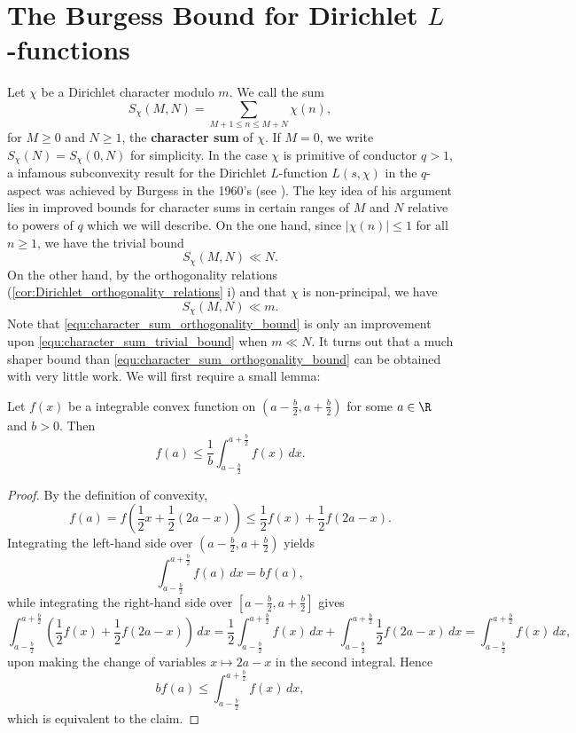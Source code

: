   \section{The Burgess Bound for Dirichlet \texorpdfstring{$L$}{L}-functions}
    Let $\chi$ be a Dirichlet character modulo $m$. We call the sum
    \[
      S_{\chi}(M,N) = \sum_{M+1 \le n \le M+N}\chi(n),
    \]
    for $M \ge 0$ and $N \ge 1$, the \textbf{character sum} of $\chi$. If $M = 0$, we write $S_{\chi}(N) = S_{\chi}(0,N)$ for simplicity. In the case $\chi$ is primitive of conductor $q > 1$, a infamous subconvexity result for the Dirichlet $L$-function $L(s,\chi)$ in the $q$-aspect was achieved by Burgess in the 1960's (see \cite{burgess1963character}). The key idea of his argument lies in improved bounds for character sums in certain ranges of $M$ and $N$ relative to powers of $q$ which we will describe. On the one hand, since $|\chi(n)| \le 1$ for all $n \ge 1$, we have the trivial bound
    \begin{equation}\label{equ:character_sum_trivial_bound}
      S_{\chi}(M,N) \ll N.
    \end{equation}
    On the other hand, by the orthogonality relations (\cref{cor:Dirichlet_orthogonality_relations} i) and that $\chi$ is non-principal, we have
    \begin{equation}\label{equ:character_sum_orthogonality_bound}
      S_{\chi}(M,N) \ll m.
    \end{equation}
    Note that \cref{equ:character_sum_orthogonality_bound} is only an improvement upon \cref{equ:character_sum_trivial_bound} when $m \ll N$. It turns out that a much shaper bound than \cref{equ:character_sum_orthogonality_bound} can be obtained with very little work. We will first require a small lemma:

    \begin{lemma}\label{lem:Polya-Vinogradov_lemma}
      Let $f(x)$ be a integrable convex function on $\left(a-\frac{b}{2},a+\frac{b}{2}\right)$ for some $a \in \R$ and $b > 0$. Then
      \[
        f(a) \le \frac{1}{b}\int_{a-\frac{b}{2}}^{a+\frac{b}{2}}f(x)\,dx.
      \]
    \end{lemma}
    \begin{proof}
      By the definition of convexity,
      \[
        f(a) = f\left(\frac{1}{2}x+\frac{1}{2}(2a-x)\right) \le \frac{1}{2}f(x)+\frac{1}{2}f(2a-x).
      \]
      Integrating the left-hand side over $\left(a-\frac{b}{2},a+\frac{b}{2}\right)$ yields
      \[
        \int_{a-\frac{b}{2}}^{a+\frac{b}{2}}f(a)\,dx = bf(a),
      \]
      while integrating the right-hand side over $\left[a-\frac{b}{2},a+\frac{b}{2}\right]$ gives
      \[
        \int_{a-\frac{b}{2}}^{a+\frac{b}{2}}\left(\frac{1}{2}f(x)+\frac{1}{2}f(2a-x)\right)\,dx = \frac{1}{2}\int_{a-\frac{b}{2}}^{a+\frac{b}{2}}f(x)\,dx+\int_{a-\frac{b}{2}}^{a+\frac{b}{2}}\frac{1}{2}f(2a-x)\,dx = \int_{a-\frac{b}{2}}^{a+\frac{b}{2}}f(x)\,dx,
      \]
      upon making the change of variables $x \mapsto 2a-x$ in the second integral. Hence
      \[
        bf(a) \le \int_{a-\frac{b}{2}}^{a+\frac{b}{2}}f(x)\,dx,
      \]
      which is equivalent to the claim.
    \end{proof}
    
